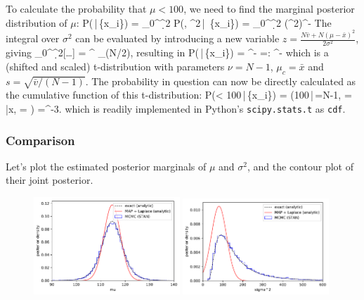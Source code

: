 \documentclass[10pt,oneside]{article}
\begin{document}
To calculate the probability that $\mu < 100$, we need to find the marginal posterior distribution of $\mu$:
\be
	P(\mu\,|\,\{x_i\}) = \intop_0^\infty \d{\sigma^2} P(\mu, \sigma^2\,|\, \{x_i\}) =  \intop_0^\infty \d{\sigma^2} (\sigma^2)^{-} \exp{}
\ee
The integral over $\sigma^2$ can be evaluated by introducing a new variable $z = \frac{N\bar v + N(\mu - \bar x)^2}{2\sigma^2}$, giving
\be
	\intop_0^\infty\d{\sigma^2}[\ldots] = ^{} _{\Gamma(N/2)},
\ee
resulting in
\be
	P(\mu\,|\,\{x_i\}) 
	= 
	  ^{-} 
	=: 
	  ^{-}
\ee
which is a (shifted and scaled) t-distribution with parameters $\nu = N-1$, $\mu_c = \bar x$ and $s = \sqrt{\bar v / (N-1)}$. The probability in question can now be directly calculated as the cumulative function of this t-distribution:
\be
	P(\mu < 100\,|\,\{x_i\}) \;=\; (100\,|\,\nu=N-1, \; = \bar x, \; = ) \; =^{-3}.
\ee
which is readily implemented in Python's \texttt{scipy.stats.t} as \texttt{cdf}.


\subsubsection*{Comparison}
Let's plot the estimated posterior marginals of $\mu$ and $\sigma^2$, and the contour plot of their joint posterior.
\begin{figure}[h]
\centering
	\includegraphics[width=0.49\textwidth]{P3_mu_posterior.pdf}
	\includegraphics[width=0.49\textwidth]{P3_sigma2_posterior.pdf}
\end{figure}
\end{document}
